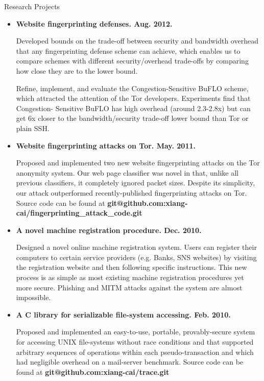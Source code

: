 \documentclass[11pt,oneside]{article}
\newenvironment{ressection}[1]{
	\vspace{4pt}
	{\fontfamily{phv}\selectfont\Large#1}
	\begin{itemize}
	\vspace{3pt}
}{
	\end{itemize}
}
\newcommand{\resitem}[1]{
	\vspace{-4pt}
	\item \begin{flushleft} #1 \end{flushleft}
}
\begin{document}
\begin{ressection}{Research Projects}

	\resitem{\textbf{Website fingerprinting defenses. Aug.
		2012.} 
		\begin{small}
		
		Developed bounds on the trade-off between security and
		bandwidth overhead that any fingerprinting defense scheme can
		achieve, which enables us to compare schemes with different
		security/overhead trade-offs by comparing how close they are
		to the lower bound. 
		
		Refine, implement, and evaluate
		the Congestion-Sensitive BuFLO scheme, which attracted the attention of the
		Tor developers. Experiments find that Congestion-
		Sensitive BuFLO has high overhead (around 2.3-2.8x) but can
		get 6x closer to the bandwidth/security trade-off lower bound
		than Tor or plain SSH.
		\end{small}				
	}

	\resitem{\textbf{Website fingerprinting attacks on Tor. May.
		2011.} 
		\begin{small}
		
		Proposed and implemented two new website fingerprinting
			attacks on the Tor anonymity system. Our web page
			classifier was novel in that, unlike all previous
			classifiers, it completely ignored packet sizes. Despite
			its simplicity, our attack outperformed 
			recently-published fingerprinting attacks on Tor. Source code can be found at \textbf{git@github.com:xiang-cai/fingerprinting\_attack\_code.git}
		\end{small}				
	}

	\resitem{\textbf{A novel machine registration procedure. Dec.
		2010.}
		\begin{small}
		
		Designed a novel online machine
			registration system. Users can register their computers to
			certain service providers (e.g. Banks, SNS websites) by
			visiting the registration website and then following specific
			instructions. This new process is as simple as most existing
			machine registration procedures yet more secure. Phishing and MITM attacks against the
			system are almost impossible.
		\end{small}	
	}
			
	\resitem{\textbf{A C library for serializable file-system
				accessing. Feb. 2010.} 
		\begin{small}
		
		Proposed and implemented an
					easy-to-use, portable, provably-secure system for
					accessing UNIX file-systems without race conditions
					and that supported arbitrary sequences of operations
					within each pseudo-transaction and which had
					negligible overhead on a mail-server
					benchmark. Source code can be found at \textbf{git@github.com:xiang-cai/trace.git}
		\end{small}
	}
	

\end{ressection}
\end{document}
